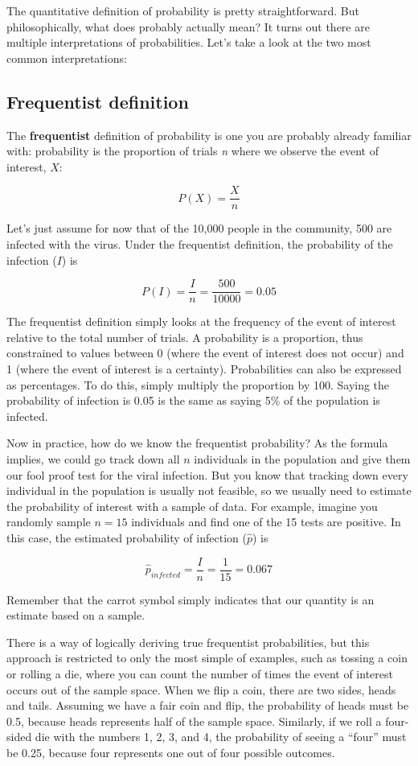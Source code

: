 \documentclass[
]{book}
\begin{document}
The quantitative definition of probability is pretty straightforward. But philosophically, what does probably actually mean? It turns out there are multiple interpretations of probabilities. Let's take a look at the two most common interpretations:

\subsection{Frequentist definition}\label{frequentist-definition}

The \textbf{frequentist} definition of probability is one you are probably already familiar with: probability is the proportion of trials \emph{n} where we observe the event of interest, \(X\):

\[
P(X) = \frac{X}{n}
\]

Let's just assume for now that of the 10,000 people in the community, 500 are infected with the virus. Under the frequentist definition, the probability of the infection (\(I\)) is

\[
P(I) = \frac{I}{n} = \frac{500}{10000}=0.05
\]

The frequentist definition simply looks at the frequency of the event of interest relative to the total number of trials. A probability is a proportion, thus constrained to values between 0 (where the event of interest does not occur) and 1 (where the event of interest is a certainty). Probabilities can also be expressed as percentages. To do this, simply multiply the proportion by 100. Saying the probability of infection is 0.05 is the same as saying 5\% of the population is infected.

Now in practice, how do we know the frequentist probability? As the formula implies, we could go track down all \(n\) individuals in the population and give them our fool proof test for the viral infection. But you know that tracking down every individual in the population is usually not feasible, so we usually need to estimate the probability of interest with a sample of data. For example, imagine you randomly sample \(n = 15\) individuals and find one of the 15 tests are positive. In this case, the estimated probability of infection (\(\hat{p}\)) is

\[
\hat{p}_{infected} = \frac{I}{n} = \frac{1}{15}=0.067
\]

Remember that the carrot symbol simply indicates that our quantity is an estimate based on a sample.

There is a way of logically deriving true frequentist probabilities, but this approach is restricted to only the most simple of examples, such as tossing a coin or rolling a die, where you can count the number of times the event of interest occurs out of the sample space. When we flip a coin, there are two sides, heads and tails. Assuming we have a fair coin and flip, the probability of heads must be 0.5, because heads represents half of the sample space. Similarly, if we roll a four-sided die with the numbers 1, 2, 3, and 4, the probability of seeing a ``four'' must be 0.25, because four represents one out of four possible outcomes.
\end{document}
